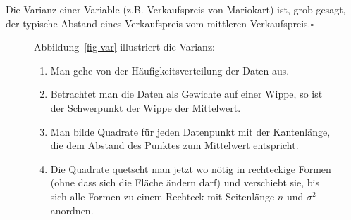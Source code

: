 \documentclass[
  letterpaper,
]{scrbook}
\providecommand{\tightlist}{%
  \setlength{\itemsep}{0pt}\setlength{\parskip}{0pt}}\usepackage{longtable,booktabs,array}
\theoremstyle{definition}
\theoremstyle{definition}
\theoremstyle{definition}
\theoremstyle{remark}
\begin{document}
\begin{tcolorbox}[enhanced jigsaw, colbacktitle=quarto-callout-note-color!10!white, coltitle=black, bottomrule=.15mm, rightrule=.15mm, arc=.35mm, toptitle=1mm, colframe=quarto-callout-note-color-frame, opacitybacktitle=0.6, left=2mm, leftrule=.75mm, breakable, opacityback=0, bottomtitle=1mm, titlerule=0mm, title=\textcolor{quarto-callout-note-color}{\faInfo}\hspace{0.5em}{Hinweis}, colback=white, toprule=.15mm]

Die Varianz einer Variable (z.B. Verkaufspreis von Mariokart) ist, grob
gesagt, der typische Abstand eines Verkaufspreis vom mittleren
Verkaufspreis.\(\square\)

\end{tcolorbox}

\begin{figure}

\begin{minipage}{0.60\linewidth}
Abbildung~\ref{fig-var} illustriert die Varianz:

\begin{enumerate}
\def\labelenumi{\arabic{enumi}.}
\tightlist
\item
  Man gehe von der Häufigkeitsverteilung der Daten aus.
\item
  Betrachtet man die Daten als Gewichte auf einer Wippe, so ist der
  Schwerpunkt der Wippe der Mittelwert.
\item
  Man bilde Quadrate für jeden Datenpunkt mit der Kantenlänge, die dem
  Abstand des Punktes zum Mittelwert entspricht.
\item
  Die Quadrate quetscht man jetzt wo nötig in rechteckige Formen (ohne
  dass sich die Fläche ändern darf) und verschiebt sie, bis sich alle
  Formen zu einem Rechteck mit Seitenlänge \(n\) und \(\sigma^2\)
  anordnen.
\end{enumerate}

\end{minipage}%
%
\begin{minipage}{0.40\linewidth}

\begin{figure}[H]

\centering{

}
\end{figure}
\end{minipage}
\end{figure}
\end{document}
